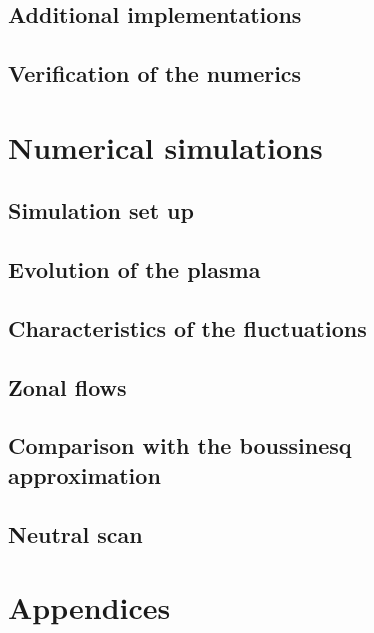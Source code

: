 \documentclass[12pt,a4paper,oneside,openright]{report} %
\begin{document}
\chapter{Additional implementations}
\label{chap:additionalImplementation}






\chapter{Verification of the numerics}
\label{chap:verification}


\part{Numerical simulations}
\label{part:results}

\chapter{Simulation set up}

\chapter{Evolution of the plasma}

\chapter{Characteristics of the fluctuations}

\chapter{Zonal flows}

\chapter{Comparison with the boussinesq approximation}

\chapter{Neutral scan}


\part{Appendices}
\appendix
\end{document}
